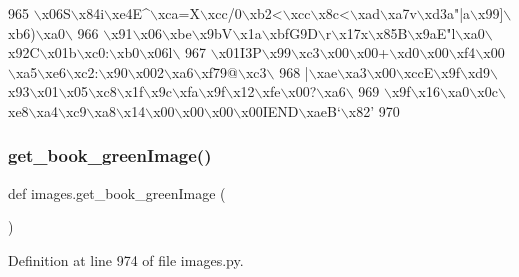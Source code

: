\begin{DoxyCode}
965 \textcolor{stringliteral}{\(\backslash\)x06S\(\backslash\)x84i\(\backslash\)xe4E^\(\backslash\)xca=X\(\backslash\)xcc/0\(\backslash\)xb2<\(\backslash\)xcc\(\backslash\)x8c<\(\backslash\)xad\(\backslash\)xa7v\(\backslash\)xd3a"|a\(\backslash\)x99]\(\backslash\)xb6)\(\backslash\)xa0\(\backslash\)}
966 \textcolor{stringliteral}{\(\backslash\)x91\(\backslash\)x06\(\backslash\)xbe\(\backslash\)x9bV\(\backslash\)x1a\(\backslash\)xbfG9D\(\backslash\)r\(\backslash\)x17x\(\backslash\)x85B\(\backslash\)x9aE"l\(\backslash\)xa0\(\backslash\)x92C\(\backslash\)x01b\(\backslash\)xc0:\(\backslash\)xb0\(\backslash\)x06l\(\backslash\)}
967 \textcolor{stringliteral}{\(\backslash\)x01I3P\(\backslash\)x99\(\backslash\)xc3\(\backslash\)x00\(\backslash\)x00+\(\backslash\)xd0\(\backslash\)x00\(\backslash\)xf4\(\backslash\)x00\(\backslash\)xa5\(\backslash\)xe6\(\backslash\)xc2:\(\backslash\)x90\(\backslash\)x002\(\backslash\)xa6\(\backslash\)xf79@\(\backslash\)xc3\(\backslash\)}
968 \textcolor{stringliteral}{|\(\backslash\)xae\(\backslash\)xa3\(\backslash\)x00\(\backslash\)xccE\(\backslash\)x9f\(\backslash\)xd9\(\backslash\)x93\(\backslash\)x01\(\backslash\)x05\(\backslash\)xc8\(\backslash\)x1f\(\backslash\)x9c\(\backslash\)xfa\(\backslash\)x9f\(\backslash\)x12\(\backslash\)xfe\(\backslash\)x00?\(\backslash\)xa6\(\backslash\)}
969 \textcolor{stringliteral}{\(\backslash\)x9f\(\backslash\)x16\(\backslash\)xa0\(\backslash\)x0c\(\backslash\)xe8\(\backslash\)xa4\(\backslash\)xc9\(\backslash\)xa8\(\backslash\)x14\(\backslash\)x00\(\backslash\)x00\(\backslash\)x00\(\backslash\)x00IEND\(\backslash\)xaeB`\(\backslash\)x82'}
970 
\end{DoxyCode}
\mbox{\label{namespaceimages_a2b9a8cbc20f7bf72e18cac42aff4dca7}} 
\subsubsection{\texorpdfstring{get\+\_\+book\+\_\+green\+Image()}{get\_book\_greenImage()}}
{\footnotesize\ttfamily def images.\+get\+\_\+book\+\_\+green\+Image (\begin{DoxyParamCaption}{ }\end{DoxyParamCaption})}



Definition at line 974 of file images.\+py.



